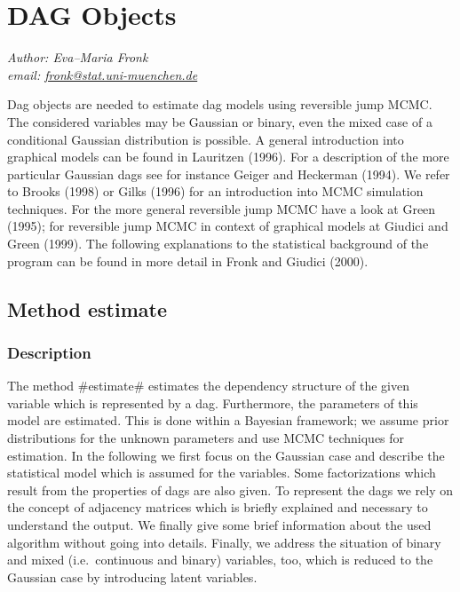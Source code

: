 \chapter{DAG Objects}
  \label{dag}

{\em Author: Eva--Maria Fronk} \\
{\em email: \href{mailto:fronk@stat.uni-muenchen.de}{fronk@stat.uni-muenchen.de}}\\
\vspace{0.3cm}



Dag objects are needed to estimate dag models using reversible
jump MCMC. The considered variables may be Gaussian or binary,
even the mixed case of a conditional Gaussian distribution is
possible. A general introduction into graphical models can be
found in Lauritzen (1996). For a description of the more
particular Gaussian dags see for instance Geiger and Heckerman
(1994). We refer to Brooks (1998) or Gilks (1996) for an
introduction into MCMC simulation techniques. For the more general
reversible jump MCMC have a look at Green (1995); for reversible
jump MCMC in context of graphical models at Giudici and Green
(1999). The following explanations to the statistical background
of the program can be found in more detail in Fronk and Giudici
(2000).



\section{Method estimate}



\subsection{Description}

The method #estimate# estimates the dependency structure of the
given variable which is represented by a dag. Furthermore, the
parameters of this model are estimated. This is done within a
Bayesian framework; we assume prior distributions for the unknown
parameters and use MCMC techniques for estimation. In the
following we first focus on the Gaussian case  and describe the
statistical model which is assumed for the variables. Some
factorizations which result from the properties of dags are also
given. To represent the dags we rely on the concept of adjacency
matrices which is briefly explained and necessary to understand
the output. We finally give some brief information about the used
algorithm without going into details. Finally, we address the
situation of binary and mixed (i.e.~continuous and binary)
variables, too, which is reduced to the Gaussian case by
introducing latent variables.


